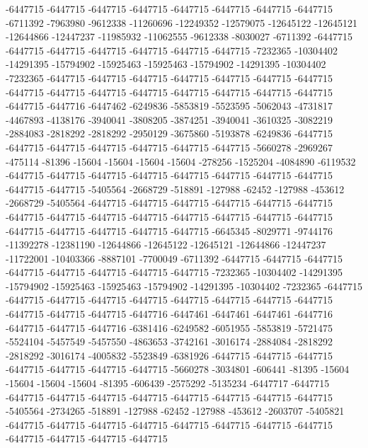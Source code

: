 -6447715 -6447715 -6447715 -6447715 -6447715 -6447715 -6447715 -6447715 -6711392 -7963980 -9612338 -11260696 -12249352 -12579075 -12645122 -12645121 -12644866 -12447237 -11985932 -11062555 -9612338 -8030027 -6711392 -6447715 -6447715 -6447715 -6447715 -6447715 -6447715 -6447715 -7232365 -10304402 -14291395 -15794902 -15925463 -15925463 -15794902 -14291395 -10304402 -7232365 -6447715 -6447715 -6447715 -6447715 -6447715 -6447715 -6447715 -6447715 -6447715 -6447715 -6447715 -6447715 -6447715 -6447715 -6447715 -6447715 -6447716 -6447462 -6249836 -5853819 -5523595 -5062043 -4731817 -4467893 -4138176 -3940041 -3808205 -3874251 -3940041 -3610325 -3082219 -2884083 -2818292 -2818292 -2950129 -3675860 -5193878 -6249836 -6447715 -6447715 -6447715 -6447715 -6447715 -6447715 -6447715 -5660278 -2969267 -475114 -81396 -15604 -15604 -15604 -15604 -278256 -1525204 -4084890 -6119532 -6447715 -6447715 -6447715 -6447715 -6447715 -6447715 -6447715 -6447715 -6447715 -6447715 -5405564 -2668729 -518891 -127988 -62452 -127988 -453612 -2668729 -5405564 -6447715 -6447715 -6447715 -6447715 -6447715 -6447715 -6447715 -6447715 -6447715 -6447715 -6447715 -6447715
-6447715 -6447715 -6447715 -6447715 -6447715 -6447715 -6447715 -6645345 -8029771 -9744176 -11392278 -12381190 -12644866 -12645122 -12645121 -12644866 -12447237 -11722001 -10403366 -8887101 -7700049 -6711392 -6447715 -6447715 -6447715 -6447715 -6447715 -6447715 -6447715 -6447715 -7232365 -10304402 -14291395 -15794902 -15925463 -15925463 -15794902 -14291395 -10304402 -7232365 -6447715 -6447715 -6447715 -6447715 -6447715 -6447715 -6447715 -6447715 -6447715 -6447715 -6447715 -6447715 -6447716 -6447461 -6447461 -6447461 -6447716 -6447715 -6447715 -6447716 -6381416 -6249582 -6051955 -5853819 -5721475 -5524104 -5457549 -5457550 -4863653 -3742161 -3016174 -2884084 -2818292 -2818292 -3016174 -4005832 -5523849 -6381926 -6447715 -6447715 -6447715 -6447715 -6447715 -6447715 -6447715 -5660278 -3034801 -606441 -81395 -15604 -15604 -15604 -15604 -81395 -606439 -2575292 -5135234 -6447717 -6447715 -6447715 -6447715 -6447715 -6447715 -6447715 -6447715 -6447715 -6447715 -5405564 -2734265 -518891 -127988 -62452 -127988 -453612 -2603707 -5405821 -6447715 -6447715 -6447715 -6447715 -6447715 -6447715 -6447715 -6447715 -6447715 -6447715 -6447715 -6447715
